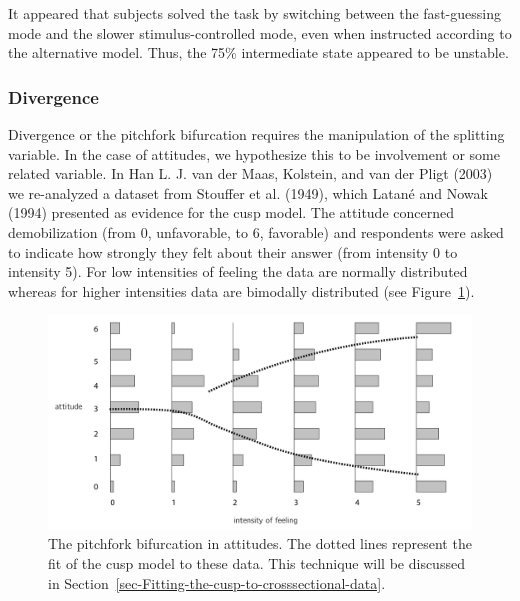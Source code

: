 \documentclass[
  a4paper,
  DIV=11,
  numbers=noendperiod,
  oneside]{scrreprt}
\begin{document}
It appeared that subjects solved the task by switching between the
fast-guessing mode and the slower stimulus-controlled mode, even when
instructed according to the alternative model. Thus, the 75\%
intermediate state appeared to be unstable.

\hypertarget{sec-Divergence}{%
\subsubsection{Divergence}\label{sec-Divergence}}

Divergence or the pitchfork bifurcation requires the manipulation of the
splitting variable. In the case of attitudes, we hypothesize this to be
involvement or some related variable. In Han L. J. van der Maas,
Kolstein, and van der Pligt (2003) we re-analyzed a dataset from
Stouffer et al. (1949), which Latané and Nowak (1994) presented as
evidence for the cusp model. The attitude concerned demobilization (from
0, unfavorable, to 6, favorable) and respondents were asked to indicate
how strongly they felt about their answer (from intensity 0 to intensity
5). For low intensities of feeling the data are normally distributed
whereas for higher intensities data are bimodally distributed (see
Figure~\ref{fig-ch3-img21-old-33}).

\begin{figure}

{\centering \includegraphics{media/ch3/ch3-21__figure33.png}

}

\caption{\label{fig-ch3-img21-old-33}The pitchfork bifurcation in
attitudes. The dotted lines represent the fit of the cusp model to these
data. This technique will be discussed in
Section~\ref{sec-Fitting-the-cusp-to-crosssectional-data}.}

\end{figure}
\end{document}
